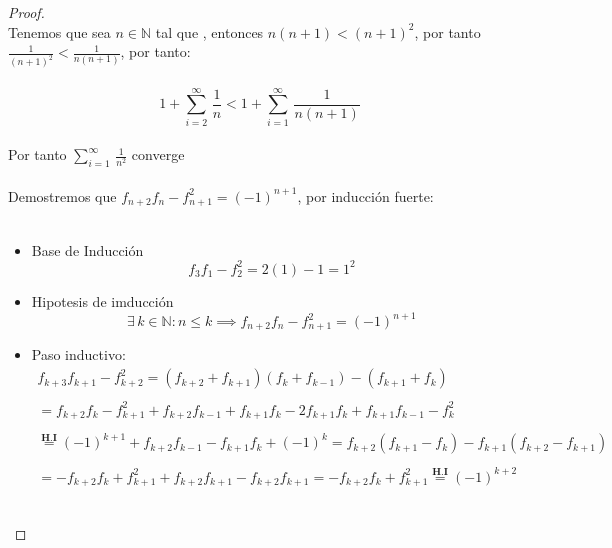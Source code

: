\documentclass[11pt,letterpaper]{article}
\newcommand{\N}{\mathbb{N}}
\begin{document}
\begin{proof}\,\\
    Tenemos que sea $n\in \N$ tal que , entonces $n(n+1)<(n+1)^2$, por tanto $\frac{1}{(n+1)^2}<\frac{1}{n(n+1)}$, por tanto:\,\\
    \,\\
    \begin{equation*}
        1+\sum_{i=2}^{\infty}\,\frac{1}{n}<1+\sum_{i=1}^{\infty}\,\frac{1}{n(n+1)}
    \end{equation*}\,\\
    Por tanto $\sum_{i=1}^{\infty}\,\frac{1}{n^2}$ converge\,\\
    \,\\
    Demostremos que $f_{n+2}f_{n}-f^2_{n+1}=(-1)^{n+1}$, por inducci\'on fuerte:\,\\
    \,\\
    \begin{itemize}
        \item Base de Inducci\'on\,\\
        \begin{equation*}
            f_3f_1-f_2^2=2(1)-1=1^2
        \end{equation*}
        \item Hipotesis de imducci\'on\,\\
        \begin{equation*}
            \exists\,k\in \N : n\leq k\implies f_{n+2}f_{n}-f^2_{n+1}=(-1)^{n+1}
        \end{equation*}
        \item Paso inductivo:\,\\
        \begin{align*}
            f_{k+3}f_{k+1}-f^2_{k+2}=(f_{k+2}+f_{k+1})(f_k+f_{k-1})-(f_{k+1}+f_k)\,\\
            \,\\=f_{k+2}f_{k}-f_{k+1}^2+f_{k+2}f_{k-1}+f_{k+1}f_{k}-2f_{k+1}f_{k}+f_{k+1}f_{k-1}-f_{k}^2\,\\
            \,\\
            \stackrel{\textbf{H.I}}{=}(-1)^{k+1}+f_{k+2}f_{k-1}-f_{k+1}f_k+(-1)^{k}=f_{k+2}(f_{k+1}-f_{k})-f_{k+1}(f_{k+2}-f_{k+1})\,\\
            \,\\
            =-f_{k+2}f_{k}+f_{k+1}^2+f_{k+2}f_{k+1}-f_{k+2}f_{k+1}=-f_{k+2}f_{k}+f_{k+1}^2\stackrel{\textbf{H.I}}{=}(-1)^{k+2}
        \end{align*}
    \end{itemize}
    \,\\

\end{proof}
\end{document}
